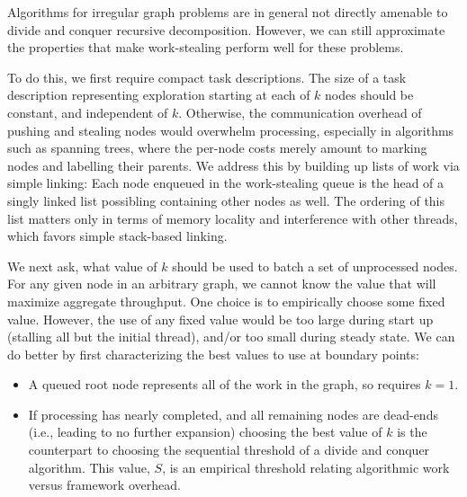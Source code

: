 Algorithms for irregular graph problems are in general not directly
amenable to divide and conquer recursive decomposition. However, we
can still approximate the properties that make work-stealing perform
well for these problems.

To do this, we first require compact task descriptions.  The size of a
task description representing exploration starting at each of $k$ nodes
should be constant, and independent of $k$. Otherwise, the communication
overhead of pushing and stealing nodes would overwhelm processing,
especially in algorithms such as spanning trees, where the per-node
costs merely amount to marking nodes and labelling their parents.  We
address this by building up lists of work via simple linking: Each
node enqueued in the work-stealing queue is the head of a singly
linked list possibling containing other nodes as well. The ordering of
this list matters only in terms of memory locality and interference
with other threads, which favors simple stack-based linking.

We next ask, what value of $k$ should be used to batch a set of
unprocessed nodes. For any given node in an arbitrary graph, we cannot
know the value that will maximize aggregate throughput.
One choice is to empirically choose some fixed value. However,
the use of any fixed value would be too large during start up
(stalling all but the initial thread), and/or too small during
steady state. We can do better by first characterizing the
best values to use at boundary points:
\begin{itemize}
  \item A queued root node represents all of the work in the graph, so
    requires $k=1$.
  \item If processing has nearly completed, and all remaining nodes are
    dead-ends (i.e., leading to no further expansion) choosing the
    best value of $k$ is the counterpart to choosing the sequential
    threshold of a divide and conquer algorithm.  This value, $S$, is an
    empirical threshold relating algorithmic work versus framework
    overhead.  
\end{itemize}

